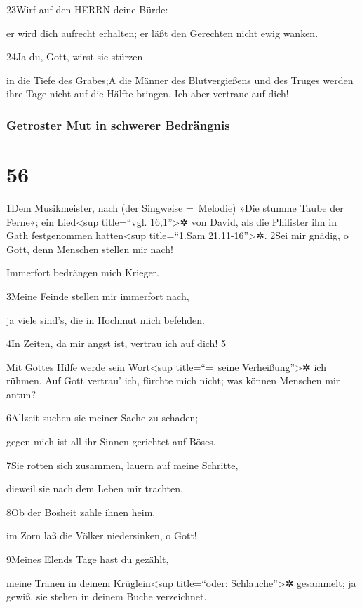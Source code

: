 23Wirf auf den HERRN deine Bürde:

er wird dich aufrecht erhalten; er läßt den Gerechten nicht ewig wanken.

24Ja du, Gott, wirst sie stürzen

in die Tiefe des Grabes;{A} die Männer des Blutvergießens und des Truges
werden ihre Tage nicht auf die Hälfte bringen. Ich aber vertraue auf
dich!

\hypertarget{getroster-mut-in-schwerer-bedruxe4ngnis}{%
\subsubsection{Getroster Mut in schwerer
Bedrängnis}\label{getroster-mut-in-schwerer-bedruxe4ngnis}}

\hypertarget{section-55}{%
\section{56}\label{section-55}}

1Dem Musikmeister, nach (der Singweise =~Melodie) »Die stumme Taube der
Ferne«; ein Lied\textless sup title=``vgl. 16,1''\textgreater✲ von
David, als die Philister ihn in Gath festgenommen hatten\textless sup
title=``1.Sam 21,11-16''\textgreater✲. 2Sei mir gnädig, o Gott, denn
Menschen stellen mir nach!

Immerfort bedrängen mich Krieger.

3Meine Feinde stellen mir immerfort nach,

ja viele sind's, die in Hochmut mich befehden.

4In Zeiten, da mir angst ist, vertrau ich auf dich! 5

Mit Gottes Hilfe werde sein Wort\textless sup title=``=~seine
Verheißung''\textgreater✲ ich rühmen. Auf Gott vertrau' ich, fürchte
mich nicht; was können Menschen mir antun?

6Allzeit suchen sie meiner Sache zu schaden;

gegen mich ist all ihr Sinnen gerichtet auf Böses.

7Sie rotten sich zusammen, lauern auf meine Schritte,

dieweil sie nach dem Leben mir trachten.

8Ob der Bosheit zahle ihnen heim,

im Zorn laß die Völker niedersinken, o Gott!

9Meines Elends Tage hast du gezählt,

meine Tränen in deinem Krüglein\textless sup title=``oder:
Schlauche''\textgreater✲ gesammelt; ja gewiß, sie stehen in deinem Buche
verzeichnet.

